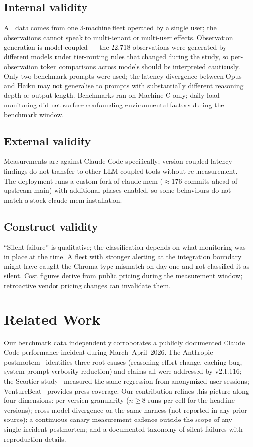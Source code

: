\documentclass[11pt,a4paper]{article}
\begin{document}
\subsection{Internal validity}

All data comes from one 3-machine fleet operated by a single user; the
observations cannot speak to multi-tenant or multi-user effects. Observation
generation is model-coupled --- the 22{,}718 observations were generated by
different models under tier-routing rules that changed during the study, so
per-observation token comparisons across models should be interpreted
cautiously. Only two benchmark prompts were used; the latency divergence
between Opus and Haiku may not generalise to prompts with substantially
different reasoning depth or output length. Benchmarks ran on Machine-C only;
daily load monitoring did not surface confounding environmental factors during
the benchmark window.

\subsection{External validity}

Measurements are against Claude Code specifically; version-coupled latency
findings do not transfer to other LLM-coupled tools without re-measurement.
The deployment runs a custom fork of claude-mem ($\approx$176 commits ahead of
upstream main) with additional phases enabled, so some behaviours do not match
a stock claude-mem installation.

\subsection{Construct validity}

``Silent failure'' is qualitative; the classification depends on what
monitoring was in place at the time. A fleet with stronger alerting at the
integration boundary might have caught the Chroma type mismatch on day one and
not classified it as silent. Cost figures derive from public pricing during
the measurement window; retroactive vendor pricing changes can invalidate them.

\section{Related Work}

Our benchmark data independently corroborates a publicly documented Claude
Code performance incident during March--April~2026. The Anthropic
postmortem~\cite{postmortem} identifies three root causes (reasoning-effort
change, caching bug, system-prompt verbosity reduction) and claims all were
addressed by v2.1.116; the Scortier study~\cite{scortier} measured the same
regression from anonymized user sessions; VentureBeat~\cite{vb} provides press
coverage. Our contribution refines this picture along four dimensions:
per-version granularity ($n \geq 8$ runs per cell for the headline versions);
cross-model divergence on the same harness (not reported in any prior source);
a continuous canary measurement cadence outside the scope of any single-incident
postmortem; and a documented taxonomy of silent failures with reproduction
details.
\end{document}
